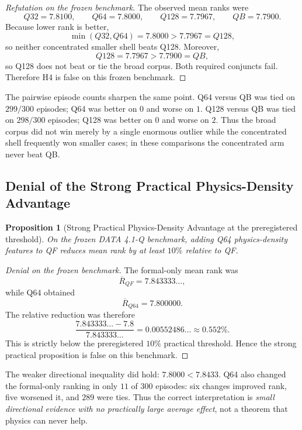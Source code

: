 \documentclass[11pt]{article}
\newtheorem{proposition}[theorem]{Proposition}
\begin{document}
\begin{proof}[Refutation on the frozen benchmark]
The observed mean ranks were
\[
Q32=7.8100,\qquad
Q64=7.8000,\qquad
Q128=7.7967,\qquad
QB=7.7900.
\]
Because lower rank is better,
\[
\min(Q32,Q64)=7.8000>7.7967=Q128,
\]
so neither concentrated smaller shell beats Q128. Moreover,
\[
Q128=7.7967>7.7900=QB,
\]
so Q128 does not beat or tie the broad corpus. Both required conjuncts fail. Therefore H4 is false on this frozen benchmark.
\end{proof}

The pairwise episode counts sharpen the same point. Q64 versus QB was tied on $299/300$ episodes; Q64 was better on $0$ and worse on $1$. Q128 versus QB was tied on $298/300$ episodes; Q128 was better on $0$ and worse on $2$. Thus the broad corpus did not win merely by a single enormous outlier while the concentrated shell frequently won smaller cases; in these comparisons the concentrated arm never beat QB.

\subsection{Denial of the Strong Practical Physics-Density Advantage}

\begin{proposition}[Strong Practical Physics-Density Advantage at the preregistered threshold]
On the frozen DATA 4.1-Q benchmark, adding Q64 physics-density features to QF reduces mean rank by at least $10\%$ relative to QF.
\end{proposition}

\begin{proof}[Denial on the frozen benchmark]
The formal-only mean rank was
\[
\overline R_{QF}=7.843333\ldots,
\]
while Q64 obtained
\[
\overline R_{Q64}=7.800000.
\]
The relative reduction was therefore
\[
\frac{7.843333\ldots-7.8}{7.843333\ldots}
=0.00552486\ldots
\approx0.552\%.
\]
This is strictly below the preregistered $10\%$ practical threshold. Hence the strong practical proposition is false on this benchmark.
\end{proof}

The weaker directional inequality did hold: $7.8000<7.8433$. Q64 also changed the formal-only ranking in only $11$ of $300$ episodes: six changes improved rank, five worsened it, and $289$ were ties. Thus the correct interpretation is \emph{small directional evidence with no practically large average effect}, not a theorem that physics can never help.
\end{document}
